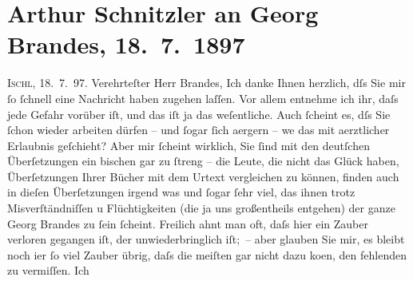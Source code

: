 

               \section[Arthur Schnitzler an Georg Brandes, 18. 7. 1897]{ Arthur Schnitzler an Georg Brandes, 18. 7. 1897}\nopagebreak{}\rehead{ }\begin{ledgroupsized}[t]{13cm}\normalsize\beginnumbering{} \toendnotes[C]{\smallbreak\pagebreak[2]} 
\pstart
           \raggedleft{}{\pb}\textsc{Ischl}, 18. 7. 97. \pend
           \pstart{}Verehrteſter Herr Brandes,\pend\pstart
           Ich danke Ihnen herzlich, dſs Sie mir ſo ſchnell eine Nachricht haben zugehen
                    laſſen. Vor allem entnehme ich ihr, daſs jede Gefahr vorüber iſt, und das iſt ja
                    das weſentliche. Auch ſcheint es, dſs Sie ſchon wieder arbeiten dürfen – und
                    ſogar ſich aergern – we{\geminationn} das mit aerztlicher {\pb}Erlaubnis geſchieht? Aber mir ſcheint
                    wirklich, Sie ſind mit den deutſchen Überſetzungen ein bischen gar zu ſtreng –
                    die Leute, die nicht das Glück haben, Überſetzungen Ihrer Bücher mit dem Urtext
                    vergleichen zu können, finden auch in dieſen Überſetzungen irgend was und ſogar
                    ſehr viel, das \introOben{}ihnen\introOben{} trotz Misverſtändniſſen u
                    Flüchtigkeiten (die ja uns \introOben{}großentheils\introOben{} entgehen) der
                    ganze Georg Brandes zu ſein ſcheint. {\pb}Freilich ahnt man oft, daſs hier ein Zauber verloren gegangen iſt, der
                    unwiederbringlich iſt; – aber glauben Sie mir, es bleibt noch i{\geminationm}er ſo viel Zauber übrig, daſs die meiſten gar
                    nicht dazu ko{\geminationm}en, den fehlenden zu vermiſſen. Ich

\end{ledgroupsized}
